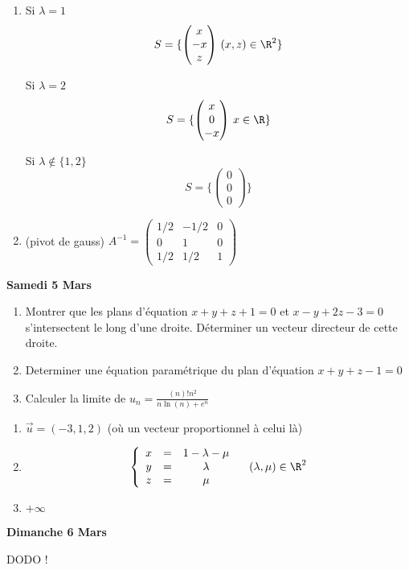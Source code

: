 \documentclass[a4paper, 11pt,reqno]{article}
\newcommand\vv[1]{\overrightarrow{#1}}
\begin{document}
\begin{correction}
\begin{enumerate}
\item Si $\lambda =1 $
$$S =\{ \begin{pmatrix}
x\\
-x\\
z
\end{pmatrix}\, (x,z)\in \R^2\}$$

Si $\lambda =2$ 
$$S =\{ \begin{pmatrix}
x\\
0\\
-x
\end{pmatrix}\, x\in \R\}$$

Si $\lambda \notin \{ 1,2\}$
$$S =\{ \begin{pmatrix}
0\\
0\\
0
\end{pmatrix}\}$$
\item (pivot de gauss)  $A^{-1}= \begin{pmatrix}
1/2 & -1/2 & 0\\
0 & 1 & 0\\
1/2 & 1/2 & 1
\end{pmatrix}$

\end{enumerate}
\end{correction}
\newpage
\begin{center}
\textbf{Samedi  5  Mars}
\end{center}

\begin{enumerate}
\item Montrer que les plans d'équation $x+y+z+1=0$ et $x-y+2z-3=0$ s'intersectent le long d'une droite.  Déterminer un vecteur directeur de cette droite. 
\item Determiner une équation paramétrique du plan d'équation $x+y+z-1=0$
\item Calculer la limite de $u_n=\frac{(n)! n^2}{n\ln(n)+e^n}$
\end{enumerate}

\begin{correction}
\begin{enumerate}
\item $\vv{u} =(-3,1,2)$ (où un vecteur proportionnel à celui là) 
\item 
$$\left\{ 
\begin{array}{ccc}
x &=& 1-\lambda -\mu\\
y &=& \lambda \\
z &=& \mu
\end{array}
\right. \quad (\lambda, \mu)\in \R^2$$

\item $+\infty$
\end{enumerate}
\end{correction}
\newpage
\begin{center}
\textbf{Dimanche  6  Mars}
\end{center}
\begin{center}
DODO ! 
\end{center}
\end{document}
